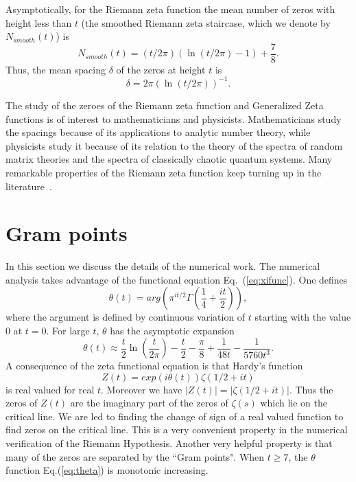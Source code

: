 \documentclass[twoside]{article}
\theoremstyle{definition}
\begin{document}
Asymptotically, for the Riemann zeta function the mean number of 
zeros with height less than $t$ (the smoothed Riemann zeta staircase, which we denote by 
$N_{smooth}(t)$) is~\cite{Edwards(1974)}
\begin{equation}  
N_{smooth}(t) = (t/2\pi)(\ln(t/2\pi)-1)+\frac{7}{8}.
\label{eq:Rnumber}
\end{equation}
Thus, the mean spacing $\delta$ of the zeros at height $t$ is 
\begin{equation}  
\delta = 2\pi(\ln (t/2\pi))^{-1}. 
\label{eq:spacing}
\end{equation}

The study of the zeroes of the Riemann zeta function and Generalized 
Zeta functions is of interest to mathematicians and physicists. Mathematicians 
study the spacings because of its applications to analytic number theory, 
while physicists study it because of its  relation 
to the theory of the spectra of random matrix theories 
and the spectra of classically chaotic quantum systems. 
Many remarkable properties of the Riemann zeta function keep turning up in the literature~\cite{os6,Matiyasevich}.

\section{\label{sec3}Gram points}

In this section we discuss the details of the numerical work. 
The numerical analysis takes advantage of the functional 
equation Eq.~(\ref{eq:xifunc}).
One defines
\begin{equation}
\theta(t) = arg (\pi^{it/2} \Gamma(\frac{1}{4} + \frac{it}{2})), 
\label{eq:theta}
\end{equation}
where the argument is defined by continuous variation of $t$ starting with the value $0$ at $t = 0$.
For large $t$, $\theta$ has the asymptotic expansion
\begin{equation}
\theta(t) \approx \frac{t}{2}\ln (\frac{t}{2\pi}) - \frac{t}{2} - \frac{\pi}{8} + \frac{1}{48t} - \frac{1}{5760t^3}. 
\label{eq:thetaAsymptotic}
\end{equation}
A consequence of the zeta functional equation is that Hardy's function 
\begin{equation}
Z(t)=exp(i\theta(t))\zeta(1/2 +it) 
\label{eq:hardy}
\end{equation}
is real valued for real $t$. 
Moreover we have $|Z(t)| = |\zeta(1/2+it)|$. Thus the zeros of $Z(t)$ are the imaginary part of the zeros 
of $\zeta(s)$ which lie on the critical line. We are led to finding the change of sign of a real valued function 
to find zeros on the critical line. This is a very convenient property in the numerical verification 
of the Riemann Hypothesis. Another very helpful property is that many of the zeros are separated by the
``Gram points".  When $t \ge 7$, the $\theta$ function Eq.(\ref{eq:theta}) is monotonic increasing. 
\end{document}

